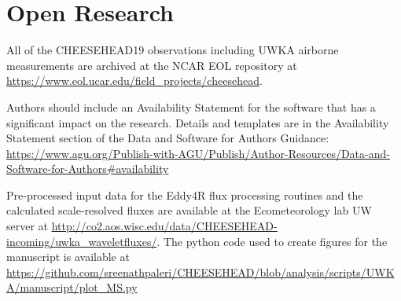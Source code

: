 \documentclass[draft]{agujournal2019}
\begin{document}
\section{Open Research}
All of the CHEESEHEAD19 observations including UWKA airborne measurements are archived at the NCAR EOL repository at \url{https://www.eol.ucar.edu/field_projects/cheesehead}. 

Authors should include an Availability Statement for the software that has a significant impact on the research. Details and templates are in the Availability Statement section of the Data and Software for Authors Guidance: \url{https://www.agu.org/Publish-with-AGU/Publish/Author-Resources/Data-and-Software-for-Authors#availability}

Pre-processed input data for the Eddy4R flux processing routines and the calculated scale-resolved fluxes are available at the Ecometeorology lab UW server at \url{http://co2.aos.wisc.edu/data/CHEESEHEAD-incoming/uwka_waveletfluxes/}. The python code used to create figures for the manuscript is available at \url{https://github.com/sreenathpaleri/CHEESEHEAD/blob/analysis/scripts/UWKA/manuscript/plot_MS.py}





\end{document}
